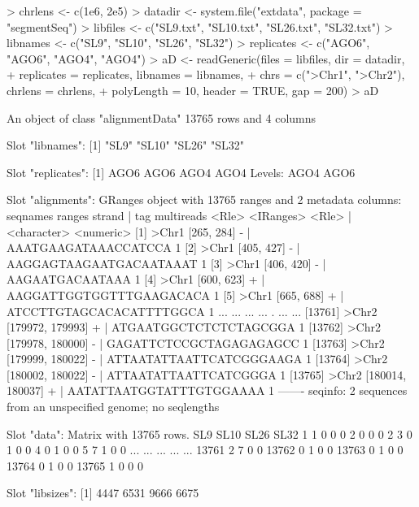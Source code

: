 \documentclass[a4paper]{article}
\begin{document}
\begin{Schunk}
\begin{Sinput}
> chrlens <- c(1e6, 2e5)
> datadir <- system.file("extdata", package = "segmentSeq")
> libfiles <- c("SL9.txt", "SL10.txt", "SL26.txt", "SL32.txt")
> libnames <- c("SL9", "SL10", "SL26", "SL32")
> replicates <- c("AGO6", "AGO6", "AGO4", "AGO4")
> aD <- readGeneric(files = libfiles, dir = datadir,
+                   replicates = replicates, libnames = libnames, 
+                   chrs = c(">Chr1", ">Chr2"), chrlens = chrlens,
+                   polyLength = 10, header = TRUE, gap = 200)
> aD
\end{Sinput}
\begin{Soutput}
An object of class "alignmentData"
13765 rows and 4 columns

Slot "libnames":
[1] "SL9"  "SL10" "SL26" "SL32"

Slot "replicates":
[1] AGO6 AGO6 AGO4 AGO4
Levels: AGO4 AGO6

Slot "alignments":
GRanges object with 13765 ranges and 2 metadata columns:
          seqnames           ranges strand |                      tag multireads
             <Rle>        <IRanges>  <Rle> |              <character>  <numeric>
      [1]    >Chr1       [265, 284]      - |     AAATGAAGATAAACCATCCA          1
      [2]    >Chr1       [405, 427]      - |  AAGGAGTAAGAATGACAATAAAT          1
      [3]    >Chr1       [406, 420]      - |          AAGAATGACAATAAA          1
      [4]    >Chr1       [600, 623]      + | AAGGATTGGTGGTTTGAAGACACA          1
      [5]    >Chr1       [665, 688]      + | ATCCTTGTAGCACACATTTTGGCA          1
      ...      ...              ...    ... .                      ...        ...
  [13761]    >Chr2 [179972, 179993]      + |   ATGAATGGCTCTCTCTAGCGGA          1
  [13762]    >Chr2 [179978, 180000]      - |  GAGATTCTCCGCTAGAGAGAGCC          1
  [13763]    >Chr2 [179999, 180022]      - | ATTAATATTAATTCATCGGGAAGA          1
  [13764]    >Chr2 [180002, 180022]      - |    ATTAATATTAATTCATCGGGA          1
  [13765]    >Chr2 [180014, 180037]      + | AATATTAATGGTATTTGTGGAAAA          1
  -------
  seqinfo: 2 sequences from an unspecified genome; no seqlengths

Slot "data":
Matrix with  13765  rows.
      SL9 SL10 SL26 SL32
1       1    0    0    0
2       0    0    0    2
3       0    1    0    0
4       0    1    0    0
5       7    1    0    0
...   ...  ...  ...  ...
13761   2    7    0    0
13762   0    1    0    0
13763   0    1    0    0
13764   0    1    0    0
13765   1    0    0    0

Slot "libsizes":
[1] 4447 6531 9666 6675
\end{Soutput}
\end{Schunk}
\end{document}
